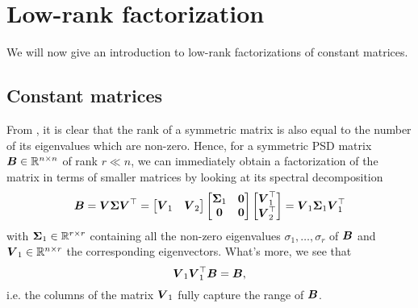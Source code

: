 
\section{Low-rank factorization}
\label{sec:3-nystrom-nystrom}

We will now give an introduction to low-rank factorizations of
constant matrices.

\subsection{Constant matrices}
\label{subsec:3-nystrom-factorization-constant-matrices}

From , it is clear that the rank of a symmetric
matrix is also equal to the number of its eigenvalues which are non-zero.
Hence, for a symmetric \gls{PSD} matrix $\boldsymbol{B} \in \mathbb{R}^{n \times n}$
of rank $r \ll n$, we can immediately obtain a factorization of the matrix in
terms of smaller matrices by looking at its spectral decomposition
\begin{equation}
    \boldsymbol{B}
        = \boldsymbol{V} \boldsymbol{\Sigma} \boldsymbol{V}^{\top} 
        = \begin{bmatrix} \boldsymbol{V}_1 & \boldsymbol{V}_2 \end{bmatrix} 
          \begin{bmatrix} \boldsymbol{\Sigma}_1 & \boldsymbol{0} \\ \boldsymbol{0} & \boldsymbol{0} \end{bmatrix} 
          \begin{bmatrix} \boldsymbol{V}_1^{\top} \\ \boldsymbol{V}_2^{\top} \end{bmatrix}
        = \boldsymbol{V}_1 \boldsymbol{\Sigma}_1 \boldsymbol{V}_1^{\top}
    \label{equ:3-nystrom-eigenvalue-decoposition}
\end{equation}
with $\boldsymbol{\Sigma}_1 \in \mathbb{R}^{r \times r}$ containing all the non-zero
eigenvalues $\sigma_1, \dots, \sigma_r$ of $\boldsymbol{B}$ and $\boldsymbol{V}_1 \in \mathbb{R}^{n \times r}$ the corresponding
eigenvectors. What's more, we see that
\begin{equation}
    \boldsymbol{V}_1 \boldsymbol{V}_1^{\top} \boldsymbol{B} = \boldsymbol{B},
    \label{equ:3-nystrom-range-captured}
\end{equation}
i.e. the columns of the matrix $\boldsymbol{V}_1$ fully capture the range of $\boldsymbol{B}$.\\

